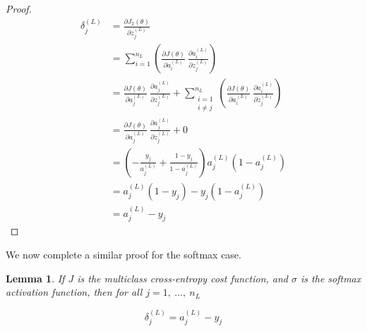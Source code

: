\documentclass{article}[11pt]
\newtheorem{lemma}{Lemma}
\begin{document}
\begin{proof}
            $$ \begin{aligned}
            \delta^{(L)}_j &= \frac{\partial J_2(\theta)}{\partial z^{(L)}_j} \\
            &= \sum_{i=1}^{n_L} \left( \frac{\partial J(\theta)}{\partial a^{(L)}_i} \ \frac{\partial a^{(L)}_i}{\partial z^{(L)}_j} \right) \\
            &= \frac{\partial J(\theta)}{\partial a^{(L)}_j} \ \frac{\partial a^{(L)}_j}{\partial z^{(L)}_j} + \sum_{\substack{i=1 \\ i \neq j}}^{n_L} \left( \frac{\partial J(\theta)}{\partial a^{(L)}_i} \ \frac{\partial a^{(L)}_i}{\partial z^{(L)}_j} \right) \\
            &= \frac{\partial J(\theta)}{\partial a^{(L)}_j} \ \frac{\partial a^{(L)}_j}{\partial z^{(L)}_j} + 0 \\
            &= \left( - \frac{y_j}{a^{(L)}_j} + \frac{1 - y_j}{1 - a^{(L)}_j} \right) a^{(L)}_j \left( 1 - a^{(L)}_j \right) \\
            &= a^{(L)}_j (1 - y_j) - y_j (1 - a^{(L)}_j) \\
            &= a^{(L)}_j - y_j
            \end{aligned} $$
            
        \end{proof}
        
        
        We now complete a similar proof for the softmax case.
        
        
        \begin{lemma}
            
            If $J$ is the multiclass cross-entropy cost function, and $\sigma$ is the softmax activation function, then for all $j = 1, \ \ldots, \ n_L$
            
            $$
            \delta^{(L)}_j = a^{(L)}_j - y_j
            $$
            
        \end{lemma}
        
\end{document}
